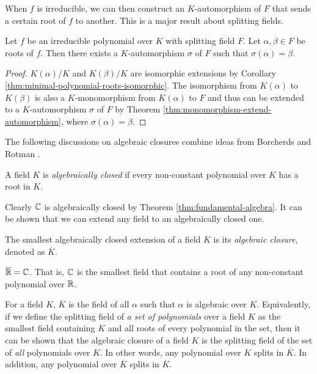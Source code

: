 When $f$ is irreducible, we can then construct an $K$-automorphism of $F$ that sends a certain root of $f$ to another. This is a major result about splitting fields. 

\begin{theorem} \label{thm:automorphism-from-zeros}
	Let $f$ be an irreducible polynomial over $K$ with splitting field $F$. Let $\alpha, \beta \in F$ be roots of $f$. Then there exists a $K$-automorphism $\sigma$ of $F$ such that $\sigma(\alpha) = \beta$. 
\end{theorem}

\begin{proof}
	$K(\alpha)/K$ and $K(\beta)/K$ are isomorphic extensions by Corollary \ref{thm:minimal-polynomial-roots-isomorphic}. The isomorphism from $K(\alpha)$ to $K(\beta)$ is also a $K$-monomorphism from $K(\alpha)$ to $F$ and thus can be extended to a $K$-automorphism $\sigma$ of $F$ by Theorem \ref{thm:monomorphism-extend-automorphism}, where $\sigma(\alpha) = \beta$.
\end{proof}

The following discussions on algebraic closures combine ideas from Borcherds \cite[Lecture~4]{galois-theory-lectures} and Rotman \cite[p.~89]{rotman_galois_1998}. 

\begin{definition}
	A field $K$ is \textit{algebraically closed} if every non-constant polynomial over $K$ has a root in $K$. 
\end{definition}

Clearly $\mathbb C$ is algebraically closed by Theorem \ref{thm:fundamental-algebra}. It can be shown that we can extend any field to an algebraically closed one. 

\begin{definition}
	The smallest algebraically closed extension of a field $K$ is its \textit{algebraic closure}, denoted as $\overline K$.
\end{definition}

\begin{example}
	$\overline {\mathbb R}  =  \mathbb C$. That is, $\mathbb C$ is the smallest field that contains a root of any non-constant polynomial over $\mathbb R$.
\end{example}


For a field $K$, $\overline K$ is the field of all $\alpha$ such that $\alpha$ is algebraic over $K$. Equivalently, if we define the splitting field of \textit{a set of polynomials} over a field $K$ as the smallest field containing $K$ and all roots of every polynomial in the set, then it can be shown that the algebraic closure of a field $K$ is the splitting field of the set of \textit{all} polynomials over $K$. In other words, any polynomial over $K$ splits in $\overline K$. In addition, any polynomial over $\overline K$ splits in $\overline K$.

